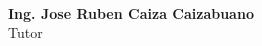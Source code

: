 
\vspace{2cm}

\begin{center}
    \begin{minipage}{0.5\textwidth}
        \centering
        \hrulefill \\
        \textbf{Ing. Jose Ruben Caiza Caizabuano} \\
        Tutor
    \end{minipage}
\end{center}